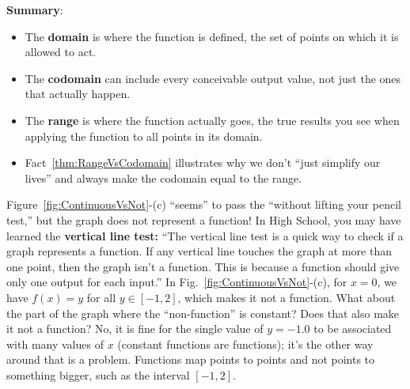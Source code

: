 \textbf{Summary}:

\begin{itemize}
    \item The \textbf{domain} is where the function is defined, the set of points on which it is allowed to act.
    \item The \textbf{codomain} can include every conceivable output value, not just the ones that actually happen. 
    \item The \textbf{range} is where the function actually goes, the true results you see when applying the function to all points in its domain.
    \item Fact~\ref{thm:RangeVsCodomain} illustrates why we don't ``just simplify our lives'' and always make the codomain equal to the range.   
\end{itemize}

\bigskip


Figure~\ref{fig:ContinuousVsNot}-(c) ``seems'' to pass the ``without lifting your pencil test,'' but the graph does not represent a function! In High School, you may have learned the \textbf{vertical line test:} ``The vertical line test is a quick way to check if a graph represents a function. If any vertical line touches the graph at more than one point, then the graph isn't a function. This is because a function should give only one output for each input.''  In Fig.~\ref{fig:ContinuousVsNot}-(c), for $x=0$, we have $f(x)=y$ for all $y\in [-1, 2]$, which makes it not a function. What about the part of the graph where the ``non-function'' is constant? Does that also make it not a function? No, it is fine for the single value of $y=-1.0$ to be associated with many values of $x$ (constant functions are functions); it's the other way around that is a problem. Functions map points to points and not points to something bigger, such as the interval $[-1, 2]$. \\


